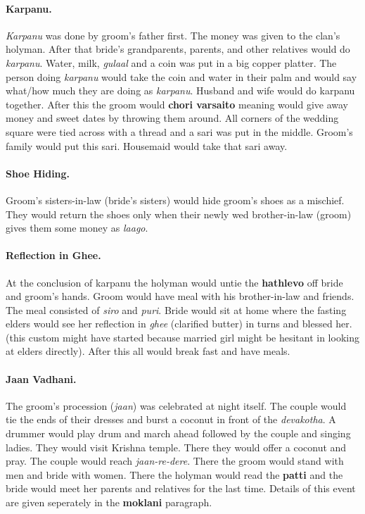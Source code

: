 \paragraph{Karpanu.} \textit{Karpanu} was done by groom's father first. The
money was given to the clan's holyman. After that bride's grandparents,
parents, and other relatives would do \textit{karpanu}. Water, milk,
\textit{gulaal} and a coin was put in a big copper platter. The person
doing \textit{karpanu} would take the coin and water in their palm and
would say what/how much they are doing as \textit{karpanu}. Husband and
wife would do karpanu together. After this the groom would \textbf{chori
varsaito} meaning would give away money and sweet dates by throwing
them around. All corners of the wedding square were tied across with
a thread and a sari was put in the middle. Groom's family would put
this sari. Housemaid would take that sari away.

\paragraph{Shoe Hiding.} Groom's sisters-in-law (bride's sisters) would hide
groom's shoes as a mischief. They would return the shoes only when their newly
wed brother-in-law (groom) gives them some money as \textit{laago}. 

\paragraph{Reflection in Ghee.} At the conclusion of karpanu the holyman would
untie the \textbf{hathlevo} off bride and groom's hands. Groom would have meal
with his brother-in-law and friends. The meal consisted of \textit{siro} and
\textit{puri}. Bride would sit at home where the fasting elders would see her
reflection in \textit{ghee} (clarified butter) in turns and blessed her. (this
custom might have started because married girl might be hesitant in
looking at elders directly). After this all would break fast and have
meals.

\paragraph{Jaan Vadhani.} The groom's procession (\textit{jaan}) was celebrated
at night itself. The couple would tie the ends of their dresses and burst a
coconut in front of the \textit{devakotha}. A drummer would play drum and march
ahead followed by the couple and singing ladies. They would visit Krishna
temple. There they would offer a coconut and pray. The couple would reach
\textit{jaan-re-dere}. There the groom would stand with men and bride with
women. There the holyman would read the \textbf{patti} and the bride would meet
her parents and relatives for the last time. Details of this event are given
seperately in the \textbf{moklani} paragraph. 

